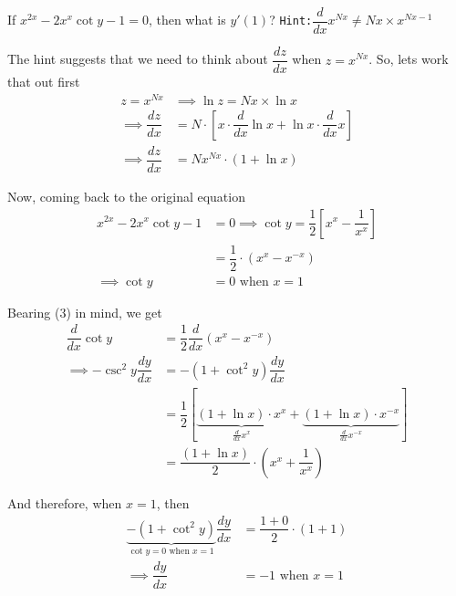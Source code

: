 

\question[3] If $x^{2x}-2x^{x}\cot y - 1 = 0$, then what is $y'(1)$?
\texttt{Hint:}$\dfrac{d}{dx}x^{Nx}\neq Nx\times x^{Nx-1}$


\ifprintanswers
\fi 

\begin{solution}[\halfpage]
  The hint suggests that we need to think about $\dfrac{dz}{dx}$ when $z=x^{Nx}$. So, lets work that out first 
  \begin{align}
    z = x^{Nx} &\implies \ln z = Nx\times\ln x \\
    \implies \dfrac{dz}{dx} &= N\cdot\left[ x\cdot\dfrac{d}{dx}\ln x + \ln x\cdot\dfrac{d}{dx}x\right] \\
    \implies \dfrac{dz}{dx} &= Nx^{Nx}\cdot(1+\ln x)
  \end{align}
  
  Now, coming back to the original equation
	\begin{align}
	  x^{2x}-2x^{x}\cot y - 1 &= 0 \implies
	  \cot y = \dfrac{1}{2}\left[x^{x}-\dfrac{1}{x^{x}} \right] \\
	  &= \dfrac{1}{2}\cdot(x^x-x^{-x}) \\
	  \implies\cot y &= 0 \text{ when } x = 1
	\end{align}
	
	Bearing (3) in mind, we get 
	\begin{align}
	  \dfrac{d}{dx}\cot y &= \dfrac{1}{2}\dfrac{d}{dx}(x^x-x^{-x}) \\
	  \implies -\csc^2 y\dfrac{dy}{dx} &= -(1+\cot^2 y)\dfrac{dy}{dx} \nonumber\\ 
	  &= \dfrac{1}{2}\left[ \underbrace{(1+\ln x)\cdot x^x}_{\frac{d}{dx}x^x} + 
	  \underbrace{(1+\ln x)\cdot x^{-x}}_{\frac{d}{dx}x^{-x}}\right] \\
	  &= \dfrac{(1+\ln x)}{2}\cdot\left(x^x + \dfrac{1}{x^x}\right)
	\end{align}
	
	And therefore, when $x=1$, then 
	\begin{align}
	  \underbrace{-(1+\cot^2 y)}_{\cot y = 0\text{ when } x=1}\dfrac{dy}{dx} &= 
	  \dfrac{1+0}{2}\cdot (1+1) \\
	  \implies \dfrac{dy}{dx} &= -1 \text{ when } x=1
	\end{align}	
\end{solution}
